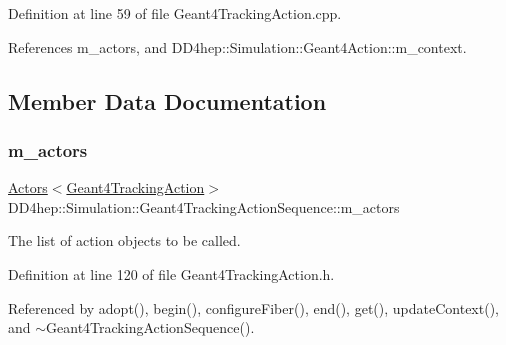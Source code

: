 Definition at line 59 of file Geant4\+Tracking\+Action.\+cpp.



References m\+\_\+actors, and D\+D4hep\+::\+Simulation\+::\+Geant4\+Action\+::m\+\_\+context.



\subsection{Member Data Documentation}
\hypertarget{class_d_d4hep_1_1_simulation_1_1_geant4_tracking_action_sequence_a198136b8ba82d7de2c4d94e631b79970}{}\label{class_d_d4hep_1_1_simulation_1_1_geant4_tracking_action_sequence_a198136b8ba82d7de2c4d94e631b79970} 
\subsubsection{\texorpdfstring{m\+\_\+actors}{m\_actors}}
{\footnotesize\ttfamily \hyperlink{class_d_d4hep_1_1_simulation_1_1_geant4_action_1_1_actors}{Actors}$<$\hyperlink{class_d_d4hep_1_1_simulation_1_1_geant4_tracking_action}{Geant4\+Tracking\+Action}$>$ D\+D4hep\+::\+Simulation\+::\+Geant4\+Tracking\+Action\+Sequence\+::m\+\_\+actors\hspace{0.3cm}{\ttfamily [protected]}}



The list of action objects to be called. 



Definition at line 120 of file Geant4\+Tracking\+Action.\+h.



Referenced by adopt(), begin(), configure\+Fiber(), end(), get(), update\+Context(), and $\sim$\+Geant4\+Tracking\+Action\+Sequence().

\hypertarget{class_d_d4hep_1_1_simulation_1_1_geant4_tracking_action_sequence_a60424cd706472478d3c4e2f5d78f9540}{}\label{class_d_d4hep_1_1_simulation_1_1_geant4_tracking_action_sequence_a60424cd706472478d3c4e2f5d78f9540} 
